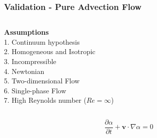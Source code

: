 \begin{frame} 
 \frametitle{\Large Validation - Pure Advection Flow}
\vspace{-1cm}
\begin{center}
\begin{columns}[c]
\begin{column}{0.8\textwidth} 
\hspace{1cm} \textbf{Assumptions}\\[0.1cm] 
\hspace{1cm}  1. Continuum hypothesis\\[0.1cm]
\hspace{1cm}  2. Homogeneous and Isotropic\\[0.1cm]
\hspace{1cm}  3. Incompressible\\[0.1cm]
\hspace{1cm}  4. Newtonian\\[0.1cm]
\hspace{1cm}  5. Two-dimensional Flow \\[0.1cm]
\hspace{1cm}  6. Single-phase Flow\\[0.1cm]
\hspace{1cm}  7. High Reynolds number ($Re = \infty$)
\end{column}
\begin{column}{0.5\textwidth}
\end{column}
\end{columns}
\end{center}
\vspace{0.5cm}
\begin{equation*}
 \frac{\partial \alpha}{\partial t} 
 + 
 \textbf{v} \cdot \nabla \alpha
 = 0
\end{equation*}
\end{frame}


